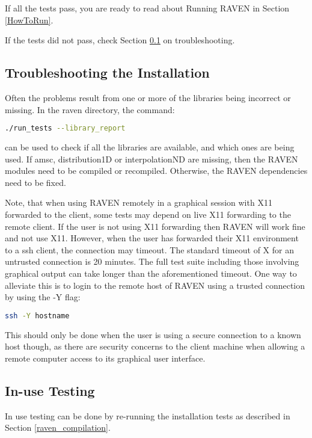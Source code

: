 If all the tests pass, you are ready to read about Running RAVEN in
Section \ref{HowToRun}.

If the tests did not pass, check Section
\ref{troubleshooting_installation} on troubleshooting.

\subsection{Troubleshooting the Installation}
\label{troubleshooting_installation}

Often the problems result from one or more of the libraries being
incorrect or missing.  In the raven directory, the command:

\begin{lstlisting}[language=bash]
./run_tests --library_report
\end{lstlisting}
can be used to check if all the libraries are available, and which
ones are being used.  If amsc, distribution1D or interpolationND are
missing, then the RAVEN modules need to be compiled or recompiled.
Otherwise, the RAVEN dependencies need to be fixed.

Note, that when using RAVEN remotely in a graphical session with X11
forwarded to the client, some tests may depend on live X11 forwarding
to the remote client. If the user is not using X11 forwarding then
RAVEN will work fine and not use X11.  However, when the user has
forwarded their X11 environment to a ssh client, the connection may
timeout. The standard timeout of X for an untrusted connection is 20
minutes.  The full test suite including those involving graphical
output can take longer than the aforementioned timeout. One way to
alleviate this is to login to the remote host of RAVEN using a trusted
connection by using the -Y flag:

\begin{lstlisting}[language=bash]
ssh -Y hostname
\end{lstlisting}

This should only be done when the user is using a secure connection to
a known host though, as there are security concerns to the client
machine when allowing a remote computer access to its graphical user
interface.


\subsection{In-use Testing}

In use testing can be done by re-running the installation tests as
described in Section \ref{raven_compilation}.
